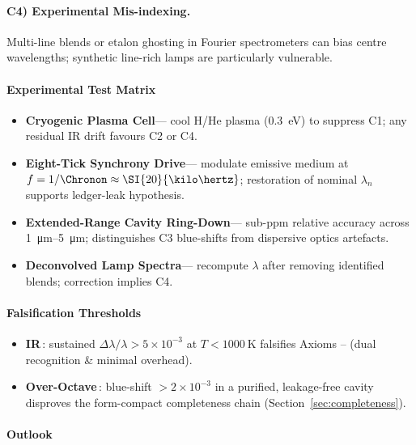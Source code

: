 \documentclass[11pt,oneside]{book}
\begin{document}
{\paragraph{C4) Experimental Mis-indexing.}
Multi-line blends or etalon ghosting in Fourier spectrometers
can bias centre wavelengths; synthetic line-rich lamps are
particularly vulnerable.

\paragraph{Experimental Test Matrix}

\begin{itemize}\setlength\itemsep{4pt}
\item \textbf{Cryogenic Plasma Cell}\;—\;
      cool H/He plasma (\SI{0.3}{\electronvolt})
      to suppress C1; any residual IR drift
      favours C2 or C4.
\item \textbf{Eight-Tick Synchrony Drive}\;—\;
      modulate emissive medium at
      $f=1/\Chronon\approx\SI{20}{\kilo\hertz}$; 
      restoration of nominal
      $\lambda_{n}$ supports ledger-leak hypothesis.
\item \textbf{Extended-Range Cavity Ring-Down}\;—\;
      sub-ppm relative accuracy across
      \SIrange{1}{5}{\micro\metre}; distinguishes C3 blue-shifts
      from dispersive optics artefacts.
\item \textbf{Deconvolved Lamp Spectra}\;—\;
      recompute $\lambda$ after removing identified blends;
      correction implies C4.
\end{itemize}

\paragraph{Falsification Thresholds}

\begin{itemize}\setlength\itemsep{4pt}
\item \textbf{IR}\,:  
      sustained $\Delta\lambda/\lambda>5\times10^{-3}$ at
      $T<\SI{1000}{\kelvin}$ falsifies
      Axioms – (dual recognition & minimal overhead).
\item \textbf{Over-Octave}\,:  
      blue-shift $>2\times10^{-3}$ in a purified,
      leakage-free cavity disproves
      the form-compact completeness chain
      (Section~\ref{sec:completeness}).
\end{itemize}

\paragraph*{Outlook}

}
\end{document}
